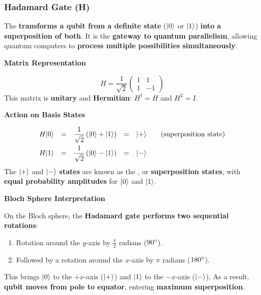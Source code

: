 \subsubsection{Hadamard Gate (H)}

The  \textbf{transforms a qubit from a definite state} ($| 0 \rangle$ or $| 1 \rangle$) \textbf{into a superposition of both}. It is the \textbf{gateway to quantum parallelism}, allowing quantum computers to \textbf{process multiple possibilities simultaneously}.

\highspace
\begin{flushleft}
    \textcolor{Green3}{ \textbf{Matrix Representation}}
\end{flushleft}
\begin{equation}
    H = \dfrac{1}{\sqrt{2}} 
    \begin{pmatrix}
        1 & 1 \\ 1 & -1
    \end{pmatrix}
\end{equation}
This matrix is \textbf{unitary} and \textbf{Hermitian}: $H^{\dagger} = H$ and $H^{2} = I$.

\highspace
\begin{flushleft}
    \textcolor{Green3}{ \textbf{Action on Basis States}}
\end{flushleft}
\begin{equation*}
    \begin{array}{rclcl}
        H | 0 \rangle &=& \dfrac{1}{\sqrt{2}}\left(| 0 \rangle + | 1 \rangle\right) &=& | + \rangle \hspace{2em} \text{(superposition state)} \\ [1em]
        H | 1 \rangle &=& \dfrac{1}{\sqrt{2}}\left(| 0 \rangle - | 1 \rangle\right) &=& | - \rangle
    \end{array}
\end{equation*}
The $| + \rangle$ and $| - \rangle$ \textbf{states} are known as the , or \textbf{superposition states}, with \textbf{equal probability amplitudes} for $| 0 \rangle$ and $| 1 \rangle$.

\highspace
\begin{flushleft}
    \textcolor{Green3}{ \textbf{Bloch Sphere Interpretation}}
\end{flushleft}
On the Bloch sphere, the \textbf{Hadamard gate performs two sequential rotations}:
\begin{enumerate}
    \item Rotation around the $y$-axis by $\frac{\pi}{2}$ radians ($90\degree$).
    \item Followed by a rotation around the $x$-axis by $\pi$ radians ($180\degree$).
\end{enumerate}
This brings $| 0 \rangle$ to the $+x$-axis ($| + \rangle$) and $| 1 \rangle$ to the $-x$-axis ($| - \rangle$). As a result, \textbf{qubit moves from pole to equator}, entering \textbf{maximum superposition}.

